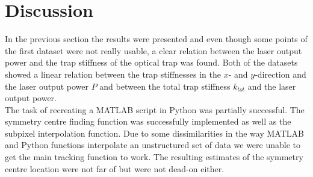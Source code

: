 \section{Discussion}
In the previous section the results were presented and even though some points of the first dataset were not really usable, a clear relation between the laser output power and the trap stiffness of the optical trap was found. Both of the datasets showed a linear relation between the trap stiffnesses in the $x$- and $y$-direction and the laser output power $P$ and between the total trap stiffness $k_{tot}$ and the laser output power.\\
The task of recreating a MATLAB script in Python was partially successful. The symmetry centre finding function was successfully implemented as well as the subpixel interpolation function. Due to some dissimilarities in the way MATLAB and Python functions interpolate an unstructured set of data we were unable to get the main tracking function to work. The resulting estimates of the symmetry centre location were not far of but were not dead-on either.\\